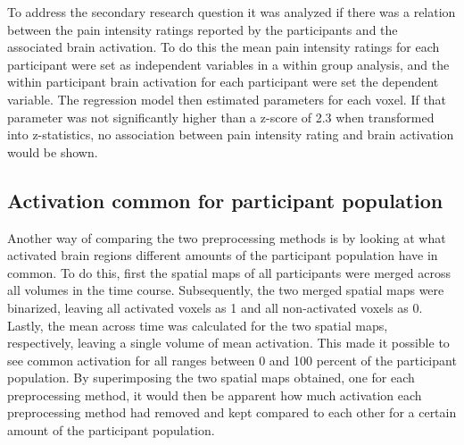 To address the secondary research question it was analyzed if there was a relation between the pain intensity ratings reported by the participants and the associated brain activation. To do this the mean pain intensity ratings for each participant were set as independent variables in a within group analysis, and the within participant brain activation for each participant were set the dependent variable. The regression model then estimated parameters for each voxel. If that parameter was not significantly higher than a z-score of 2.3 when transformed into z-statistics, no association between pain intensity rating and brain activation would be shown. 

\subsection{Activation common for participant population}
Another way of comparing the two preprocessing methods is by looking at what activated brain regions different amounts of the participant population have in common. To do this, first the spatial maps of all participants were merged across all volumes in the time course. Subsequently, the two merged spatial maps were binarized, leaving all activated voxels as 1 and all non-activated voxels as 0. Lastly, the mean across time was calculated for the two spatial maps, respectively, leaving a single volume of mean activation. This made it possible to see common activation for all ranges between 0 and 100 percent of the participant population. By superimposing the two spatial maps obtained, one for each preprocessing method, it would then be apparent how much activation each preprocessing method had removed and kept compared to each other for a certain amount of the participant population.
